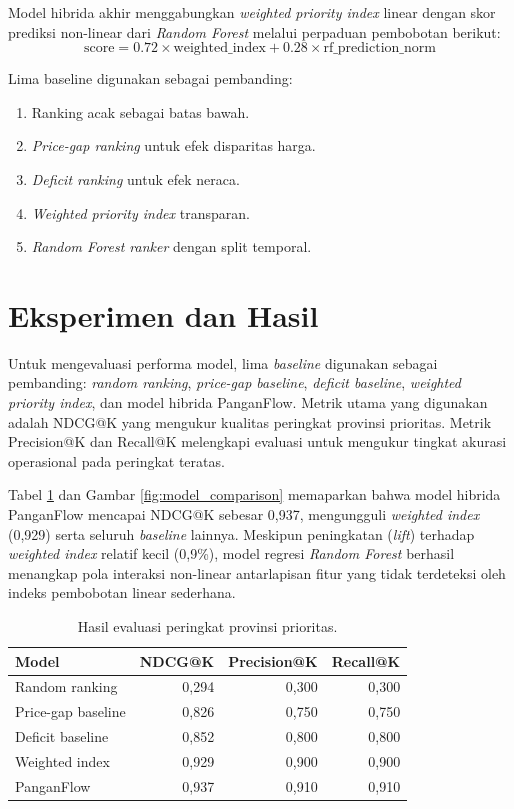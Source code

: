 \documentclass[journal, a4paper]{IEEEtran}
\begin{document}
Model hibrida akhir menggabungkan \textit{weighted priority index} linear dengan skor prediksi non-linear dari \textit{Random Forest} melalui perpaduan pembobotan berikut:
\begin{equation}
\text{score} = 0.72 \times \text{weighted\_index} + 0.28 \times \text{rf\_prediction\_norm}
\end{equation}

Lima baseline digunakan sebagai pembanding:
\begin{enumerate}
    \item Ranking acak sebagai batas bawah.
    \item \textit{Price-gap ranking} untuk efek disparitas harga.
    \item \textit{Deficit ranking} untuk efek neraca.
    \item \textit{Weighted priority index} transparan.
    \item \textit{Random Forest ranker} dengan split temporal.
\end{enumerate}



\section{Eksperimen dan Hasil}
Untuk mengevaluasi performa model, lima \textit{baseline} digunakan sebagai pembanding: \textit{random ranking}, \textit{price-gap baseline}, \textit{deficit baseline}, \textit{weighted priority index}, dan model hibrida PanganFlow. Metrik utama yang digunakan adalah NDCG@K yang mengukur kualitas peringkat provinsi prioritas. Metrik Precision@K dan Recall@K melengkapi evaluasi untuk mengukur tingkat akurasi operasional pada peringkat teratas.

Tabel \ref{tab:metrics} dan Gambar \ref{fig:model_comparison} memaparkan bahwa model hibrida PanganFlow mencapai NDCG@K sebesar 0,937, mengungguli \textit{weighted index} (0,929) serta seluruh \textit{baseline} lainnya. Meskipun peningkatan (\textit{lift}) terhadap \textit{weighted index} relatif kecil (0,9\%), model regresi \textit{Random Forest} berhasil menangkap pola interaksi non-linear antarlapisan fitur yang tidak terdeteksi oleh indeks pembobotan linear sederhana.

\begin{table}[H]
  \footnotesize
  \caption{Hasil evaluasi peringkat provinsi prioritas.}
  \label{tab:metrics}
  \begin{tabular}{lrrr}
    \toprule
    Model & NDCG@K & Precision@K & Recall@K \\
    \midrule
    Random ranking & 0,294 & 0,300 & 0,300 \\
    Price-gap baseline & 0,826 & 0,750 & 0,750 \\
    Deficit baseline & 0,852 & 0,800 & 0,800 \\
    Weighted index & 0,929 & 0,900 & 0,900 \\
    PanganFlow & 0,937 & 0,910 & 0,910 \\
    \bottomrule
  \end{tabular}
\end{table}
\end{document}
